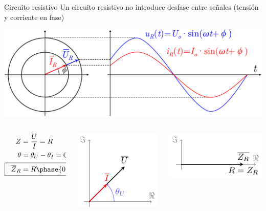 \documentclass[aspectratio=169, usenames,svgnames,dvipsnames]{beamer}
\begin{document}
\begin{frame}{Circuito resistivo}
    \vspace{2mm}
    Un circuito resistivo no introduce desfase entre señales (\alert{tensión y corriente en fase})

    \vspace{1mm}
    \begin{center}
        \includegraphics[height=0.4\textheight]{../figs/Fasores_resistencia.pdf}
    \end{center}

    \vspace{-2mm}
    \begin{columns}
    \begin{column}{0.3\columnwidth}
        \begin{align*}
          Z &= \frac{U}{I} = R\\
          \theta &= \theta_U - \theta_I = \ang{0}\\
          \Aboxed{\;\; \overline{Z}_R &= R \phase{\ang{0}} \;\; }
        \end{align*}
    \end{column}
    
    \begin{column}{0.35\columnwidth}
        \begin{center}
            \includegraphics[height=0.35\textheight]{../figs/fasorResistencia_VI.pdf}
        \end{center}
    \end{column}    
    
    \begin{column}{0.35\columnwidth}
        \begin{center}
            \includegraphics[height=0.25\textheight]{../figs/fasorResistencia.pdf}
        \end{center}
    \end{column}
    \end{columns}
\end{frame}
\end{document}
